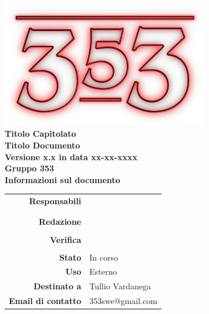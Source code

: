 \documentclass[openany, a4paper, 12pt]{report}
\begin{document}
\begin{titlepage}
	\centering
	\vfill
	{
		\bfseries
		\vskip2cm
		\includegraphics[width=9cm]{../../common/images/logo.png} \\
		\Large Titolo Capitolato\\
		\vfill
		\Huge Titolo Documento\\
		\Large Versione x.x in data xx-xx-xxxx\\
		\vfill
		\large Gruppo 353\\
		\vfill
	\normalsize Informazioni sul documento\\
\begin{table}[htbp]
	\centering
	\renewcommand\arraystretch{1.2}
	\begin{tabular}{r|l}
		\hline
		\textbf{Responsabili}	& \Elena \\
								& \Valentina\\
								& \Mirco\\
		
		\textbf{Redazione} 		& \Riccardo\\
								& \Gianluca\\
		
		\textbf{Verifica} 		& \Parwinder\\
								& \Davide\\
						
		\textbf{Stato} 			& In corso\\
		\textbf{Uso}			& Esterno\\
		\textbf{Destinato a}   	& Tullio Vardanega\\
		
						
		\textbf{Email di contatto}	& 353swe@gmail.com
	\end{tabular}
\end{table}
		\vfill
	}    
\end{titlepage}

\tableofcontents
\newpage
{}




 
\end{document}
